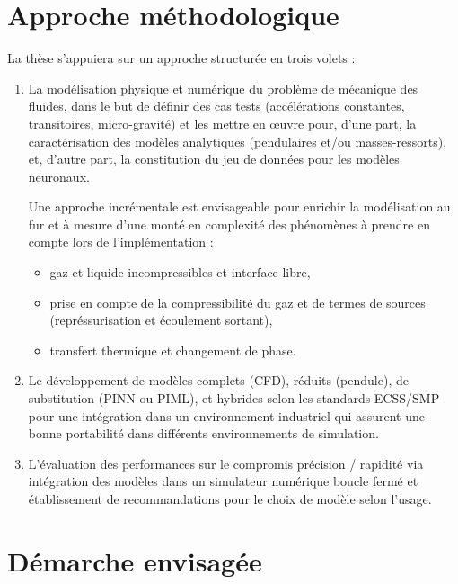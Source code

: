 \documentclass[12pt]{article}
\begin{document}
	
	\section*{Approche méthodologique}
	
	La thèse s’appuiera sur un approche structurée en trois volets :
	\begin{enumerate}
		\item La modélisation physique et numérique du problème de mécanique des fluides, dans le but de définir des cas tests (accélérations constantes, transitoires, micro-gravité) et les mettre en œuvre pour, d'une part, la caractérisation des modèles analytiques (pendulaires et/ou masses-ressorts), et, d'autre part,  la constitution du jeu de données pour les modèles neuronaux.
		
		Une approche incrémentale est envisageable pour enrichir la modélisation au fur et à mesure d'une monté en complexité des phénomènes à prendre en compte lors de l'implémentation :
		\begin{itemize}
			\item gaz et liquide incompressibles et interface libre,
			\item prise en compte de la compressibilité du gaz et de termes de sources (représsurisation et écoulement sortant),
			\item transfert thermique et changement de phase.
		\end{itemize}
		
		\item Le développement de modèles complets (CFD), réduits (pendule), de substitution (PINN ou PIML), et hybrides selon les standards ECSS/SMP pour une intégration dans un environnement industriel qui assurent une bonne portabilité dans différents environnements de simulation.
		
		\item L'évaluation des performances sur le compromis précision / rapidité via intégration des modèles dans un simulateur numérique boucle fermé et établissement de recommandations pour le choix de modèle selon l'usage.	
		
	\end{enumerate}
	
	\section*{Démarche envisagée}
	
\end{document}
